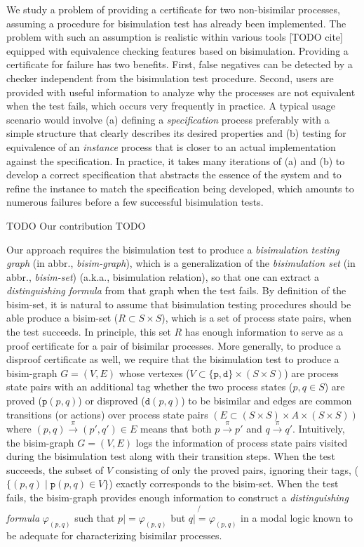 \documentclass{llncs}
\begin{document}
We study a problem of providing a certificate for two non-bisimilar processes,
assuming a procedure for bisimulation test has already been implemented.
The problem with such an assumption is realistic within various tools [TODO cite]
equipped with equivalence checking features based on bisimulation.
Providing a certificate for failure has two benefits. First, false negatives
can be detected by a checker independent from the bisimulation test procedure.
Second, users are provided with useful information to analyze why
the processes are not equivalent when the test fails, which occurs very
frequently in practice. A typical usage scenario would involve
(a) defining a \emph{specification} process preferably with a simple structure
    that clearly describes its desired properties and
(b) testing for equivalence of an \emph{instance} process that is closer to
    an actual implementation against the specification.
In practice, it takes many iterations of (a) and (b) to develop a correct
specification that abstracts the essence of the system and to refine
the instance to match the specification being developed, which amounts to
numerous failures before a few successful bisimulation tests.

TODO Our contribution TODO

Our approach requires the bisimulation test to produce
a \emph{bisimulation testing graph} (in abbr., \emph{bisim-graph}),
which is a generalization of the \emph{bisimulation set}
(in abbr., \emph{bisim-set}) (a.k.a., bisimulation relation),
so that one can extract a \emph{distinguishing formula} from that graph
when the test fails.
By definition of the bisim-set, it is natural to assume that bisimulation
testing procedures should be able produce a bisim-set ($R \subset S\times S$),
which is a set of process state pairs, when the test succeeds.
In principle, this set $R$ has enough information to serve as a proof
certificate for a pair of bisimilar processes. More generally, to produce
a disproof certificate as well, we require that the bisimulation test
to produce a bisim-graph $G=(V,E)$ whose vertexes
($V\subset\{\texttt{p},\texttt{d}\}\times(S\times S)$) are process state pairs
with an additional tag whether the two process states ($p, q\in S$) are proved
($\texttt{p}(p,q)$) or disproved ($\texttt{d}(p,q)$) to be bisimilar and edges
are common transitions (or actions) over process state pairs
$(E\subset(S\times S)\times A\times(S\times S))$ where
$(p,q)\xrightarrow{\pi}(p',q') \in E$ means that both $p\xrightarrow{\pi}p'$
and $q\xrightarrow{\pi}q'$. Intuitively, the bisim-graph $G=(V,E)$ logs
the information of process state pairs visited during the bisimulation test
along with their transition steps. When the test succeeds,
the subset of $V$ consisting of only the proved pairs, ignoring their tags,
($\{(p,q) \mid \texttt{p}(p,q)\in V\}$) exactly corresponds to the bisim-set.
When the test fails, the bisim-graph provides enough information to
construct a \emph{distinguishing formula} $\varphi_{(p,q)}$ such that
$p |= \varphi_{(p,q)}$ but $q \not{|=} \varphi_{(p,q)}$ in a modal logic
known to be adequate for characterizing bisimilar processes.
\end{document}
